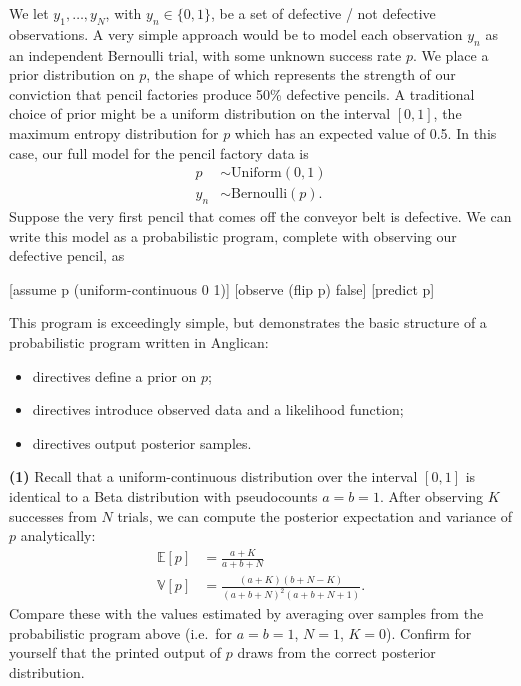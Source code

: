 \documentclass[11pt,reqno]{amsart}
\newcommand{\+}[1]{\ensuremath{{\mathbf{#1}}}}
\begin{document}
We let $y_1, \dots, y_N$, with $y_n \in \{0, 1\}$, be a set of defective / not defective observations.
A very simple approach would be to model each observation $y_n$ as an independent Bernoulli trial, with some unknown success rate $p$.
We place a prior distribution on $p$, the shape of which represents the strength of our conviction that pencil factories produce 50\% defective pencils.
A traditional choice of prior might be a uniform distribution on the interval $[0, 1]$, the maximum entropy distribution for $p$ which has an expected value of 0.5.
In this case, our full model for the pencil factory data is
\begin{align}
p &\sim \mathrm{Uniform}(0, 1) \\
y_n &\sim \mathrm{Bernoulli}(p).
\end{align}
Suppose the very first pencil that comes off the conveyor belt is defective.
We can write this model as a probabilistic program, complete with observing our defective pencil, as 
\begin{code}{}{}
[assume p (uniform-continuous 0 1)]
[observe (flip p) false]
[predict p]
\end{code}
This program is exceedingly simple, but demonstrates the basic structure of a probabilistic program written in Anglican:
\begin{itemize}
\item {} directives define a prior on $p$;
\item {} directives introduce observed data and a likelihood function;
\item {} directives output posterior samples.
\end{itemize}

\vspace{1cm}

{\bf (1)} Recall that a uniform-continuous distribution over the interval $[0,1]$ is identical to a Beta distribution with pseudocounts $a = b = 1$.
After observing $K$ successes from $N$ trials, we can compute the posterior expectation and variance of $p$ analytically:
\begin{align}
\mathbb{E}[p] &= \frac{a + K}{a + b + N} 
\\
\mathbb{V}[p] &= \frac{(a + K)(b + N - K)}{(a + b + N)^2 (a + b + N + 1)}
.
\end{align}
Compare these with the values estimated by averaging over samples from the probabilistic program above (i.e.~for $a=b=1$, $N=1$, $K=0$).
Confirm for yourself that the printed output of $p$ draws from the correct posterior distribution.
\end{document}
